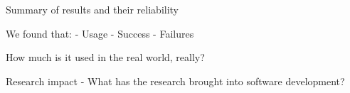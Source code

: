 \documentclass{sigchi}
\begin{document}
Summary of results and their reliability 

We found that:
- Usage
- Success
- Failures

How much is it used in the real world, really?

Research impact
- What has the research brought into software development?

\nocite{*} %

%
%
%
%
%
\balance



\end{document}
